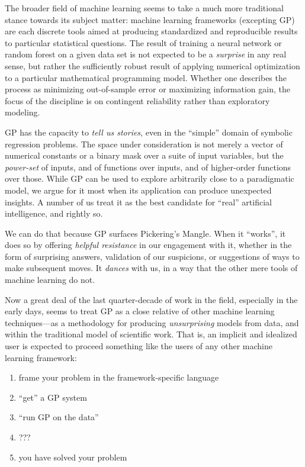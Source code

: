 The broader field of machine learning seems to take a much more traditional stance towards its subject matter: machine learning frameworks (excepting GP) are each discrete tools aimed at producing standardized and reproducible results to particular statistical questions. The result of training a neural network or random forest on a given data set is not expected to be a \emph{surprise} in any real sense, but rather the sufficiently robust result of applying numerical optimization to a particular mathematical programming model. Whether one describes the process as minimizing out-of-sample error or maximizing information gain, the focus of the discipline is on contingent reliability rather than exploratory modeling.

GP has the capacity to \emph{tell us stories}, even in the ``simple'' domain of symbolic regression problems. The space under consideration is not merely a vector of numerical constants or a binary mask over a suite of input variables, but the \emph{power-set} of inputs, and of functions over inputs, and of higher-order functions over those. While GP can be used to explore arbitrarily close to a paradigmatic model, we argue for it most when its application can produce unexpected insights. A number of us treat it as the best candidate for ``real'' artificial intelligence, and rightly so.

We can do that because GP surfaces Pickering's Mangle. When it ``works'', it does so by offering \emph{helpful resistance} in our engagement with it, whether in the form of surprising answers, validation of our suspicions, or suggestions of ways to make subsequent moves. It \emph{dances} with us, in a way that the other mere tools of machine learning do not.

Now a great deal of the last quarter-decade of work in the field, especially in the early days, seems to treat GP as a close relative of other machine learning techniques---as a methodology for producing \emph{unsurprising} models from data, and within the traditional model of scientific work. That is, an implicit and idealized user is expected to proceed something like the users of any other machine learning framework:

\begin{enumerate}
\item frame your problem in the framework-specific language
\item ``get'' a GP system
\item ``run GP on the data''
\item ???
\item you have solved your problem
\end{enumerate}

